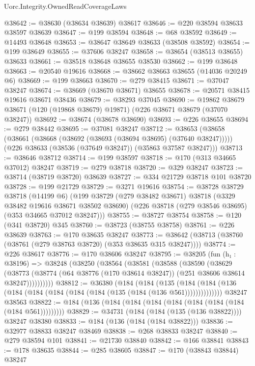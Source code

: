 \begin{lexlean}{Uorc.Integrity.OwnedReadCoverageLaws}
\begin{coremodule}
@38642 := @38630 (@38634 @38639) @38617
@38646 := @220 @38594 @38633 @38597 @38639
@38647 := @199 @38594
@38648 := @68 @38592
@38649 := @14493 @38648
@38653 := @38647 @38649 @38633 (@38508 @38592)
@38654 := @199 @38649
@38655 := @37606 @38247
@38658 := @38654 (@38513 @38655) @38633
@38661 := @38518 @38648 @38655 @38530
@38662 := @199 @38648
@38663 := @20540 @19616
@38668 := @38662 @38663 @38655 (@14036 @20249 @6)
@38669 := @199 @38663
@38670 := @279 @38415
@38671 := @37047 @38247
@38674 := @38669 (@38670 @38671) @38655
@38678 := @20571 @38415 @19616 @38671 @38436
@38679 := @38293 @37045
@38690 := @19862 @38679 @38671 (@120 (@19868 @38679) @19871) (@226 @38671 @38679 (@37070 @38247))
@38692 := @38674 (@38678 @38690)
@38693 := @226 @38655
@38694 := @279 @38442
@38695 := @37081 @38247
@38712 := @38653
    (@38658
      (@38661 (@38668 (@38692 (@38693 (@38694 @38695) (@37640 @38247)))))
      (@226 @38633 (@38536 (@37649 @38247)) (@35863 @37587 @38247)))
@38713 := @38646 @38712
@38714 := @199 @38597
@38718 := @170 (@313 @34665 @37012) @38247
@38719 := @279 @38718
@38720 := @329 @38247
@38723 := @38714 (@38719 @38720) @38639
@38727 := @334 @21729 @38718 @101 @38720
@38728 := @199 @21729
@38729 := @3271 @19616
@38754 := @38728
    @38729
    @38718
    (@14199 @6)
    (@199
      @38729
      (@279 @38482 @38671)
      @38718
      (@3329 @38482 @19616 @38671 @38502 @38690)
      (@226 @38718 (@279 @38546 @38695) (@353 @34665 @37012 @38247)))
@38755 := @38727 @38754
@38758 := @120 (@341 @38720) @345
@38760 := @38723 (@38755 @38758)
@38761 := @226 @38639
@38763 := @170 @38635 @38247
@38773 := @38642 (@38713 (@38760 (@38761 (@279 @38763 @38720) (@353 @38635 @315 @38247))))
@38774 := @226 @38617
@38776 := @170 @38606 @38247
@38795 := @38205
    (fun (h₁ : @38196) =>
    @38248
      (@38250
        (@38564
          (@38581
            (@38588
              (@38590
                (@38629
                  (@38773
                    (@38774 (@64 @38776 (@170 @38614 @38247)) (@251 @38606 @38614 @38247))))))))))
@38812 := @36380
    (@184
      (@184
        (@135 (@184 (@184 (@136 (@184 (@184 (@184 (@184 (@184 (@135 (@184 (@136 @561))))))))))))))
    @38247
    @38563
@38822 := @184 (@136 (@184 (@184 (@184 (@184 (@184 (@184 (@184 (@184 @561)))))))))
@38829 := @34731 (@184 (@184 (@135 (@136 @38822)))) @38247 @38380
@38833 := @184 (@136 (@184 (@184 @38822)))
@38836 := @32977 @38833 @38247 @38469
@38838 := @268 @38833 @38247
@38840 := @279 @38594 @101
@38841 := @21730 @38840
@38842 := @166 @38841
@38843 := @178 @38635
@38844 := @285 @38605
@38847 := @170 (@38843 @38844) @38247

\end{coremodule}
\end{lexlean}
